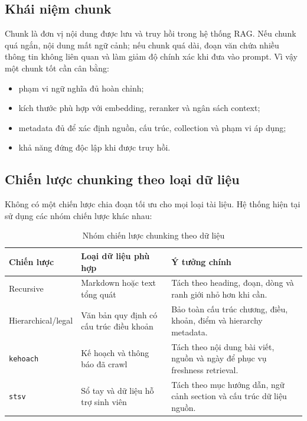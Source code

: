 \documentclass[../DoAn.tex]{subfiles}
\begin{document}
\subsection{Khái niệm chunk}

Chunk là đơn vị nội dung được lưu và truy hồi trong hệ thống RAG. Nếu chunk quá
ngắn, nội dung mất ngữ cảnh; nếu chunk quá dài, đoạn văn chứa nhiều thông tin
không liên quan và làm giảm độ chính xác khi đưa vào prompt. Vì vậy một chunk tốt
cần cân bằng:

\begin{itemize}
    \item phạm vi ngữ nghĩa đủ hoàn chỉnh;
    \item kích thước phù hợp với embedding, reranker và ngân sách context;
    \item metadata đủ để xác định nguồn, cấu trúc, collection và phạm vi áp dụng;
    \item khả năng đứng độc lập khi được truy hồi.
\end{itemize}

\subsection{Chiến lược chunking theo loại dữ liệu}

Không có một chiến lược chia đoạn tối ưu cho mọi loại tài liệu. Hệ thống hiện
tại sử dụng các nhóm chiến lược khác nhau:

\begin{table}[h]
\centering
\begin{tabular}{|l|p{4.0cm}|p{6.4cm}|}
\hline
\textbf{Chiến lược} & \textbf{Loại dữ liệu phù hợp} & \textbf{Ý tưởng chính} \\
\hline
Recursive & Markdown hoặc text tổng quát & Tách theo heading, đoạn, dòng và
ranh giới nhỏ hơn khi cần. \\
\hline
Hierarchical/legal & Văn bản quy định có cấu trúc điều khoản & Bảo toàn cấu trúc
chương, điều, khoản, điểm và hierarchy metadata. \\
\hline
\texttt{kehoach} & Kế hoạch và thông báo đã crawl & Tách theo nội dung bài viết,
nguồn và ngày để phục vụ freshness retrieval. \\
\hline
\texttt{stsv} & Sổ tay và dữ liệu hỗ trợ sinh viên & Tách theo mục hướng dẫn,
ngữ cảnh section và cấu trúc dữ liệu nguồn. \\
\hline
\end{tabular}
\caption{Nhóm chiến lược chunking theo dữ liệu}
\end{table}
\end{document}
